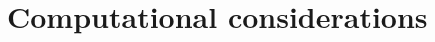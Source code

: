 \documentclass[3p,computermodern,10pt]{elsarticle}
\begin{document}

\section{Computational considerations}
\end{document}

